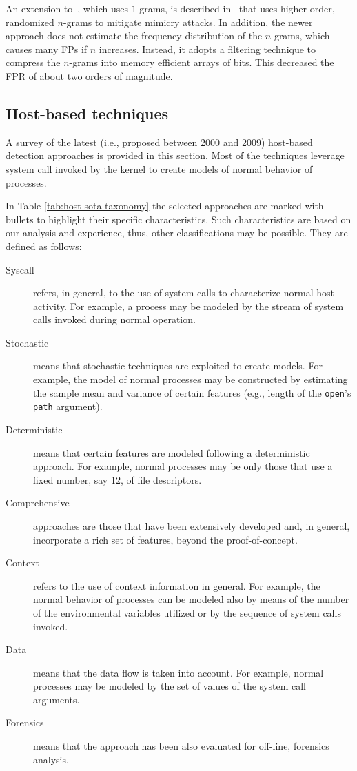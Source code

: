 An extension to~\citep{wang:raid2004:payl}, which uses $1$-grams, is
described in~\citep{wang:raid2006:anagram} that uses higher-order,
randomized $n$-grams to mitigate mimicry attacks. In addition, the
newer approach does not estimate the frequency distribution of the
$n$-grams, which causes many \acp{FP} if $n$
increases. Instead, it adopts a filtering technique to compress the
$n$-grams into memory efficient arrays of bits. This decreased the
\ac{FPR} of about two orders of magnitude.

\subsection{Host-based techniques}
\label{detection:ad:host} A survey of the latest (i.e., proposed
between 2000 and 2009) host-based detection approaches is provided in
this section. Most of the techniques leverage system call invoked by
the kernel to create models of normal behavior of processes.

In Table \ref{tab:host-sota-taxonomy} the selected approaches are
marked with bullets to highlight their specific characteristics. Such
characteristics are based on our analysis and experience, thus, other
classifications may be possible. They are defined as follows:

\begin{description}
\item[Syscall] refers, in general, to the use of system calls to
characterize normal host activity. For example, a process may be
modeled by the stream of system calls invoked during normal operation.
\item[Stochastic] means that stochastic techniques are exploited to
create models. For example, the model of normal processes may be
constructed by estimating the sample mean and variance of certain
features (e.g., length of the \texttt{open}'s \texttt{path} argument).
\item[Deterministic] means that certain features are modeled following
a deterministic approach. For example, normal processes may be only
those that use a fixed number, say 12, of file descriptors.
\item[Comprehensive] approaches are those that have been extensively
developed and, in general, incorporate a rich set of features, beyond
the proof-of-concept.
\item[Context] refers to the use of context information in
general. For example, the normal behavior of processes can be modeled
also by means of the number of the environmental variables utilized or
by the sequence of system calls invoked.
\item[Data] means that the data flow is taken into account. For
example, normal processes may be modeled by the set of values of the
system call arguments.
\item[Forensics] means that the approach has been also evaluated for
off-line, forensics analysis.
\end{description}

